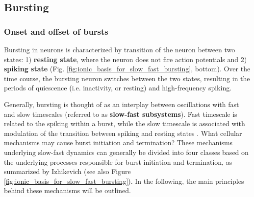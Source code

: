\documentclass[../main.tex]{subfiles}
\begin{document}

\subsection{Bursting}

\subsubsection{Onset and offset of bursts}

Bursting in neurons is characterized by transition of the neuron between two states: 1) \textbf{resting state}, where the neuron does not fire action potentials and 2) \textbf{spiking state} (Fig. \ref{fig:ionic_basis_for_slow_fast_bursting}, bottom). Over the time course, the bursting neuron switches between the two states, resulting in the periods of quiescence (i.e. inactivity, or resting) and high-frequency spiking.

Generally, bursting is thought of as an interplay between oscillations with fast and slow timescales (referred to as \textbf{slow-fast subsystems}). Fast timescale is related to the spiking within a burst, while the slow timescale is associated with modulation of the transition between spiking and resting states \cite{izhikevichDynamicalSystemsNeuroscience2006}. What cellular mechanisms may cause burst initiation and termination? These mechanisms underlying slow-fast dynamics can generally be divided into four classes based on the underlying processes responsible for burst initiation and termination, as summarized by Izhikevich \cite{izhikevichDynamicalSystemsNeuroscience2006} (see also Figure \ref{fig:ionic_basis_for_slow_fast_bursting}). In the following, the main principles behind these mechanisms will be outlined.
\end{document}
